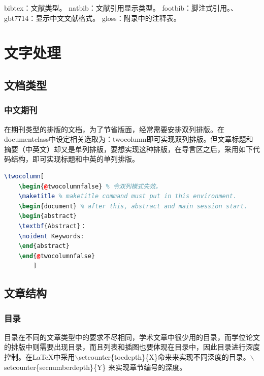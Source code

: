 \documentclass[12pt]{book}
\begin{document}
bibtex：文献类型。
natbib：文献引用显示类型。
footbib：脚注式引用。、
gbt7714：显示中文文献格式。
gloss：附录中的注释表。




\chapter{文字处理}

\section{文档类型}

\subsection{中文期刊}

在期刊类型的排版的文档，为了节省版面，经常需要安排双列排版。在documentclass中设定相关选取为：twocolumn即可实现双列排版。但文章标题和摘要（中英文）却又是单列排版，要想实现这种排版，在导言区之后，采用如下代码结构，即可实现标题和中英的单列排版。

\begin{lstlisting}[language=tex,breaklines]
	\twocolumn[
	\begin{@twocolumnfalse} % 令双列模式失效。
	\maketitle % maketitle command must put in this environment.
	\begin{document} % after this, abstract and main session start.
	\begin{abstract}
	\textbf{Abstract}：
	\noident Keywords:
	\end{abstract}
	\end{@twocolumnfalse}
		]	
\end{lstlisting}

\section{文章结构}


\subsection{目录}

目录在不同的文章类型中的要求不尽相同，学术文章中很少用的目录，而学位论文的排版中则需要出现目录，而且列表和插图也要体现在目录中，因此目录进行深度控制。在\LaTeX{}中采用$\backslash$setcounter\{tocdepth\}\{X\}命来来实现不同深度的目录。$\backslash$setcounter\{secnumberdepth\}\{Y\} 来实现章节编号的深度。
\end{document}
